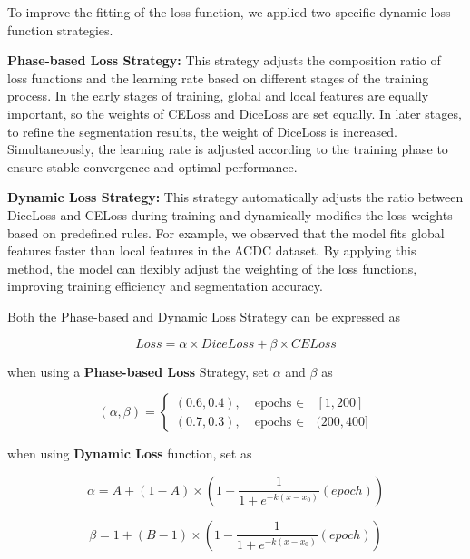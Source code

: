 \documentclass[sn-mathphys-num]{sn-jnl}
\theoremstyle{thmstyleone}%
\theoremstyle{thmstyletwo}%
\theoremstyle{thmstylethree}%
\begin{document}
To improve the fitting of the loss function, we applied two specific dynamic loss function strategies.

\textbf{Phase-based Loss Strategy:}
This strategy adjusts the composition ratio of loss functions and the learning rate based on different stages of the training process.
In the early stages of training, global and local features are equally important, so the weights of CELoss and DiceLoss are set equally.
In later stages, to refine the segmentation results, the weight of DiceLoss is increased.
Simultaneously, the learning rate is adjusted according to the training phase to ensure stable convergence and optimal performance.

\textbf{Dynamic Loss Strategy:}
This strategy automatically adjusts the ratio between DiceLoss and CELoss during training and dynamically modifies the loss weights based on predefined rules.
For example, we observed that the model fits global features faster than local features in the ACDC dataset.
By applying this method, the model can flexibly adjust the weighting of the loss functions, improving training efficiency and segmentation accuracy.

Both the Phase-based and Dynamic Loss Strategy can be expressed as

\begin{equation}
    Loss = \alpha\times DiceLoss + \beta\times CELoss\label{eq16}
\end{equation}

when using a \textbf{Phase-based Loss} Strategy, set \(\alpha\) and \(\beta\) as

\begin{equation}
    (\alpha, \beta) =
    \begin{cases}
        (0.6, 0.4), & \text{epochs \(\in\) } [1, 200] \\
        (0.7, 0.3), & \text{epochs \(\in\) } (200, 400]\label{eq17}
    \end{cases}
\end{equation}

when using \textbf{Dynamic Loss} function, set as

\begin{equation}
    \alpha = A + \left(1-A\right)\times\left(1-\frac{1}{1+e^{-k\left(x-x_0\right)}}\left(epoch\right)\right)
\end{equation}

\begin{equation}
    \beta = 1 + \left(B-1\right)\times\left(1-\frac{1}{1+e^{-k\left(x-x_0\right)}}\left(epoch\right)\right)
\end{equation}
\end{document}
